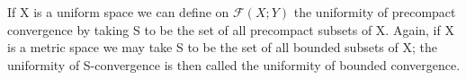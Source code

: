 If X is a uniform space we can define on \(\mathcal{F}(X;Y)\) the uniformity of precompact convergence by taking S to be the set of all precompact subsets of X. Again, if X is a metric space we may take S to be the set of all bounded subsets of X; the uniformity of S-convergence is then called the uniformity of bounded convergence.

